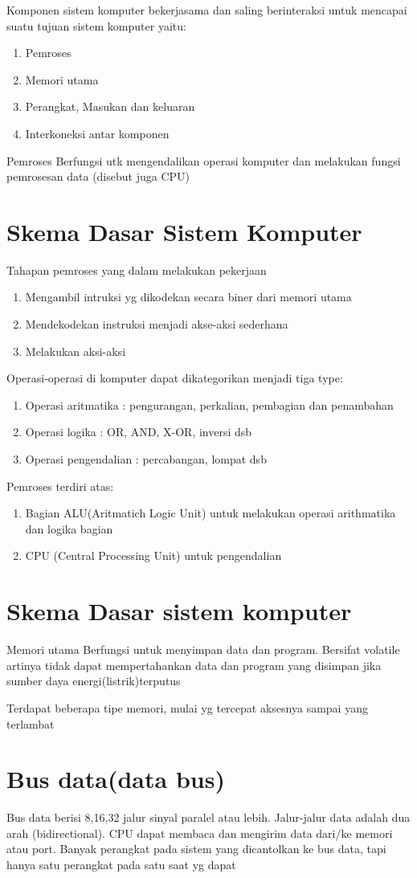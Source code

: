 Komponen sistem komputer bekerjasama dan saling berinteraksi untuk mencapai suatu tujuan sistem komputer yaitu:

\begin{enumerate}
\item Pemroses
\item Memori utama
\item Perangkat, Masukan dan keluaran
\item Interkoneksi antar komponen
\end{enumerate}


Pemroses
Berfungsi utk mengendalikan operasi komputer dan melakukan fungsi pemrosesan data (disebut juga CPU)


\section{Skema Dasar Sistem Komputer}
Tahapan pemroses yang dalam melakukan pekerjaan
\begin{enumerate}
\item Mengambil intruksi yg dikodekan secara biner dari memori utama
\item Mendekodekan instruksi menjadi akse-aksi sederhana
\item Melakukan aksi-aksi
\end{enumerate}

Operasi-operasi di komputer dapat dikategorikan menjadi tiga type:
\begin{enumerate}
\item Operasi aritmatika : pengurangan, perkalian, pembagian dan penambahan
\item Operasi logika : OR, AND, X-OR, inversi dsb
\item Operasi pengendalian : percabangan, lompat dsb
\end{enumerate}

Pemroses terdiri atas:
\begin{enumerate}
\item Bagian ALU(Aritmatich Logic Unit) untuk melakukan operasi arithmatika dan logika bagian
\item CPU (Central Processing Unit) untuk pengendalian 
\end{enumerate}

\section{Skema Dasar sistem komputer}
Memori utama
Berfungsi untuk menyimpan data dan program. Bersifat volatile artinya tidak dapat mempertahankan data dan program yang disimpan jika sumber daya energi(listrik)terputus

Terdapat beberapa tipe memori, mulai yg tercepat aksesnya sampai yang terlambat

\section{Bus data(data bus)}
Bus data berisi 8,16,32 jalur sinyal paralel atau lebih. Jalur-jalur data adalah dua arah (bidirectional). CPU dapat membaca dan mengirim data dari/ke memori atau port. 
Banyak perangkat pada sistem yang dicantolkan ke bus data, tapi hanya satu perangkat pada satu saat yg dapat

